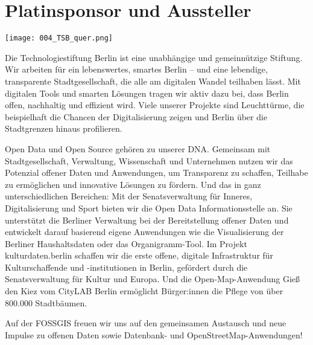 \section*{Platinsponsor und Aussteller}

\vspace{-0.5cm}
\centerline{\texttt{[image: 004\_TSB\_quer.png]}}
Die Technologiestiftung Berlin ist eine unabhängige und gemeinnützige Stiftung. Wir arbeiten für ein lebenswertes, smartes Berlin – und eine lebendige, transparente Stadtgesellschaft, die alle am digitalen Wandel teilhaben lässt. Mit digitalen Tools und smarten Lösungen tragen wir aktiv dazu bei, dass Berlin offen, nachhaltig und effizient wird. Viele unserer Projekte sind Leuchttürme, die beispielhaft die Chancen der Digitalisierung zeigen und Berlin über die Stadtgrenzen hinaus profilieren.

Open Data und Open Source gehören zu unserer DNA. Gemeinsam mit Stadtgesellschaft, Verwaltung, Wissenschaft und Unternehmen nutzen wir das Potenzial offener Daten und Anwendungen, um Transparenz zu schaffen, Teilhabe zu ermöglichen und innovative Lösungen zu fördern. Und das in ganz unterschiedlichen Bereichen: Mit der Senatsverwaltung für Inneres, Digitalisierung und Sport bieten wir die Open Data Informationsstelle an. Sie unterstützt die Berliner Verwaltung bei der Bereitstellung offener Daten und entwickelt darauf basierend eigene Anwendungen wie die Visualisierung der Berliner Haushaltsdaten oder das Organigramm-Tool. Im Projekt kulturdaten.berlin schaffen wir die erste offene, digitale Infrastruktur für Kulturschaffende und -institutionen in Berlin, gefördert durch die Senatsverwaltung für Kultur und Europa. Und die Open-Map-Anwendung Gieß den Kiez vom CityLAB Berlin ermöglicht Bürger:innen die Pflege von über 800.000 Stadtbäumen.

Auf der FOSSGIS freuen wir uns auf den gemeinsamen Austausch und neue Impulse zu offenen Daten sowie Datenbank- und OpenStreetMap-Anwendungen!
\normalsize
